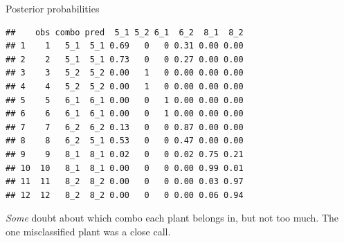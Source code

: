 \documentclass[ignorenonframetext,]{beamer}
\newenvironment{Shaded}{\begin{snugshade}}{\end{snugshade}}
\newcommand{\DataTypeTok}[1]{\textcolor[rgb]{0.13,0.29,0.53}{#1}}
\newcommand{\DecValTok}[1]{\textcolor[rgb]{0.00,0.00,0.81}{#1}}
\newcommand{\KeywordTok}[1]{\textcolor[rgb]{0.13,0.29,0.53}{\textbf{#1}}}
\newcommand{\NormalTok}[1]{#1}
\newcommand{\OperatorTok}[1]{\textcolor[rgb]{0.81,0.36,0.00}{\textbf{#1}}}
\newcommand{\StringTok}[1]{\textcolor[rgb]{0.31,0.60,0.02}{#1}}
\begin{document}
\begin{frame}[fragile]{Posterior probabilities}
\protect\hypertarget{posterior-probabilities-1}{}

\scriptsize

\begin{Shaded}
\end{Shaded}

\begin{verbatim}
##    obs combo pred  5_1 5_2 6_1  6_2  8_1  8_2
## 1    1   5_1  5_1 0.69   0   0 0.31 0.00 0.00
## 2    2   5_1  5_1 0.73   0   0 0.27 0.00 0.00
## 3    3   5_2  5_2 0.00   1   0 0.00 0.00 0.00
## 4    4   5_2  5_2 0.00   1   0 0.00 0.00 0.00
## 5    5   6_1  6_1 0.00   0   1 0.00 0.00 0.00
## 6    6   6_1  6_1 0.00   0   1 0.00 0.00 0.00
## 7    7   6_2  6_2 0.13   0   0 0.87 0.00 0.00
## 8    8   6_2  5_1 0.53   0   0 0.47 0.00 0.00
## 9    9   8_1  8_1 0.02   0   0 0.02 0.75 0.21
## 10  10   8_1  8_1 0.00   0   0 0.00 0.99 0.01
## 11  11   8_2  8_2 0.00   0   0 0.00 0.03 0.97
## 12  12   8_2  8_2 0.00   0   0 0.00 0.06 0.94
\end{verbatim}

\normalsize

\emph{Some} doubt about which combo each plant belongs in, but not too
much. The one misclassified plant was a close call.

\end{frame}
\end{document}
